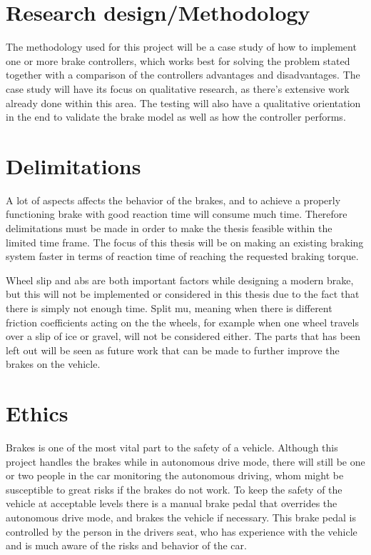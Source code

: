 \documentclass[a4paper,11pt]{kth-mag}
\begin{document}
\section{Research design/Methodology}
The methodology used for this project will be a case study of how to implement one or more brake controllers, which works best for solving the problem stated together with a comparison of the controllers advantages and disadvantages. The case study will have its focus on qualitative research, as there's extensive work already done within this area. The testing will also have a qualitative orientation in the end to validate the brake model as well as how the controller performs. 

\section{Delimitations}
A lot of aspects affects the behavior of the brakes, and to achieve a properly functioning brake with good reaction time will consume much time. Therefore delimitations must be made in order to make the thesis feasible within the limited time frame. The focus of this thesis will be on making an existing braking system faster in terms of reaction time of reaching the requested braking torque. 

Wheel slip and \gls{abs} are both important factors while designing a modern brake, but this will not be implemented or considered in this thesis due to the fact that there is simply not enough time. Split mu, meaning when there is different friction coefficients acting on the the wheels, for example when one wheel travels over a slip of ice or gravel, will not be considered either. The parts that has been left out will be seen as future work that can be made to further improve the brakes on the vehicle. 
 

\section{Ethics}
Brakes is one of the most vital part to the safety of a vehicle. Although this project handles the brakes while in autonomous drive mode, there will still be one or two people in the car monitoring the autonomous driving, whom might be susceptible to great risks if the brakes do not work. To keep the safety of the vehicle at acceptable levels there is a manual brake pedal that overrides the autonomous drive mode, and brakes the vehicle if necessary. This brake pedal is controlled by the person in the drivers seat, who has experience with the vehicle and is much aware of the risks and behavior of the car. 
\end{document}
